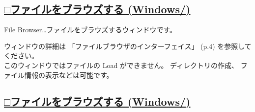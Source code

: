 \documentclass[a4paper,10pt]{article}
\begin{document}
\newpage

\subsection*{\uline{□ファイルをブラウズする (Windows/)}}

\normalsize
\noindent File Browser…ファイルをブラウズするウィンドウです。\par
\footnotesize
\noindent ウィンドウの詳細は 「ファイルブラウザのインターフェイス」 (p.4) を参照してください。\\
このウィンドウではファイルの Load ができません。 ディレクトリの作成、 ファイル情報の表示などは可能です。\\

\subsection*{\uline{□ファイルをブラウズする (Windows/)}}
\end{document}
